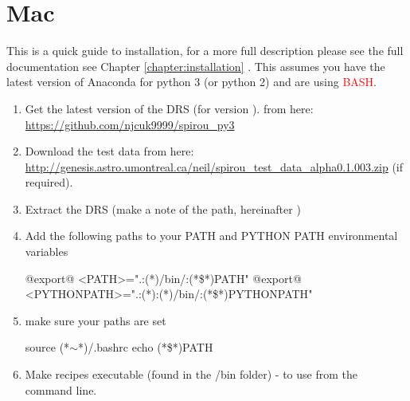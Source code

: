 \section{Mac}
\label{chapter:quickinstallation:mac}

\noindent This is a quick guide to installation, for a more full description please \ifquickguide see the full documentation \else see Chapter \ref{chapter:installation} \fi. This assumes you have the latest version of Anaconda for python 3 (or python 2) and are using \textcolor{red}{BASH}.


\begin{enumerate}

\item Get the latest version of the DRS (for \instrument version \MyCodeVersion). from here: \url{https://github.com/njcuk9999/spirou_py3}

\item Download the test data from here: \url{http://genesis.astro.umontreal.ca/neil/spirou_test_data_alpha0.1.003.zip} (if required).

\item Extract the DRS (make a note of the path, hereinafter \InstallDIR)

\item Add the following paths to your PATH and PYTHON PATH environmental variables

	\begin{bashbox}[title={e.g. in $\sim$/.bashrc or $\sim$/.bash\_profile}]
	@export@ <PATH>=".:(*\InstallDIR*)/bin/:{(*\$*)PATH}"
	@export@ <PYTHONPATH>=".:(*\InstallDIR*):(*\InstallDIR*)/bin/:{(*\$*)PYTHONPATH}"
	\end{bashbox}

\item make sure your paths are set
	\begin{cmdbox}
	source (*$\sim$*)/.bashrc
	echo (*\$*)PATH
	\end{cmdbox}

\item Make recipes executable (found in the \InstallDIR/bin folder) - to use from the command line.


\end{enumerate}
